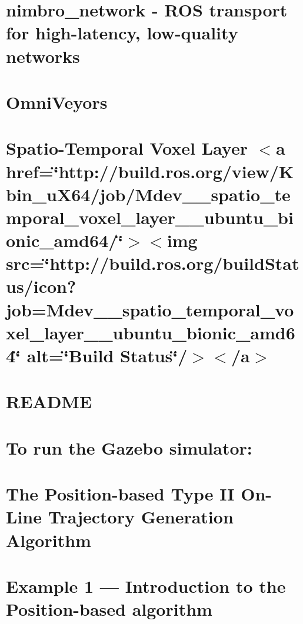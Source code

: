 \let\mypdfximage\pdfximage\def\pdfximage{\immediate\mypdfximage}\documentclass[twoside]{book}
\newcommand{\+}{\discretionary{\mbox{\scriptsize$\hookleftarrow$}}{}{}}
\begin{document}
\chapter{nimbro\+\_\+network -\/ R\+OS transport for high-\/latency, low-\/quality networks}
\label{md_nimbro_network_README}

\chapter{Omni\+Veyors}
\label{md_README}

\chapter{Spatio-\/\+Temporal Voxel Layer $<$a href=\char`\"{}http\+://build.\+ros.\+org/view/\+Kbin\+\_\+u\+X64/job/\+Mdev\+\_\+\+\_\+spatio\+\_\+temporal\+\_\+voxel\+\_\+layer\+\_\+\+\_\+ubuntu\+\_\+bionic\+\_\+amd64/\char`\"{}$>$$<$img src=\char`\"{}http\+://build.\+ros.\+org/build\+Status/icon?job=\+Mdev\+\_\+\+\_\+spatio\+\_\+temporal\+\_\+voxel\+\_\+layer\+\_\+\+\_\+ubuntu\+\_\+bionic\+\_\+amd64\char`\"{} alt=\char`\"{}\+Build Status\char`\"{}/$>$$<$/a$>$}
\label{md_spatio_temporal_voxel_layer_README}

\chapter{R\+E\+A\+D\+ME}
\label{md__home_jonathan_OmniDev_src_omniveyor_common_README}

\chapter{To run the Gazebo simulator\+:}
\label{md__home_jonathan_OmniDev_src_omniveyor_gazebo_world_README}

\chapter{The Position-\/based Type II On-\/\+Line Trajectory Generation Algorithm}
\label{page_TypeIIAndIVOverview}

\chapter{Example 1 --- Introduction to the Position-\/based algorithm}
\label{page_Code_01_RMLPositionSampleApplication}

\end{document}

